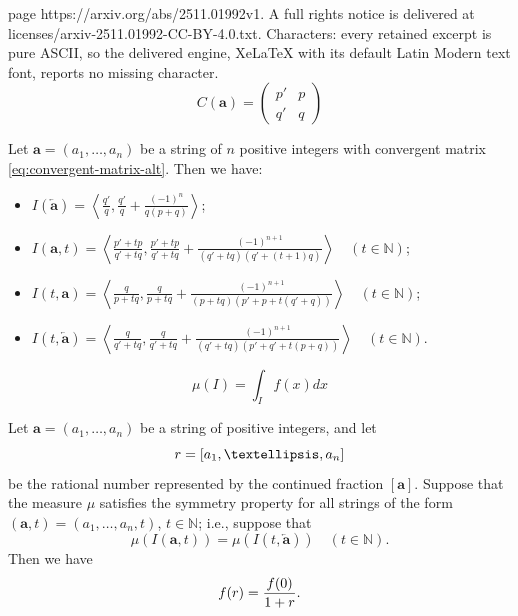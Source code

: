 \documentclass[10pt,a4paper]{amsart}
\newcommand{\Fundint}[1]{\left\langle #1\right\rangle}
\newcommand{\NN}{\mathbb{N}}
\newcommand{\bfar}{\overleftarrow{\bfa}}
\newcommand{\bfa}{\mathbf{a}}
\begin{document}
page https://arxiv.org/abs/2511.01992v1. A full rights notice is delivered at licenses/arxiv-2511.01992-CC-BY-4.0.txt. Characters: every retained excerpt is pure ASCII, so the delivered engine, XeLaTeX with its default Latin Modern text font, reports no missing character.
\begin{equation}
\label{eq:convergent-matrix-alt}
C(\bfa)=
\begin{pmatrix} p'&p\\q'&q \end{pmatrix}
\end{equation}

\begin{lemma}
\label{lem:fundamental-intervals1}
Let $\bfa=(a_1,\dots,a_n)$
be a string of $n$ positive integers with convergent matrix
\eqref{eq:convergent-matrix-alt}. Then we have:
\begin{itemize}
\item[(i)]
$\displaystyle I(\bfar)=
\Fundint{\frac{q'}{q},\frac{q'}{q}+\frac{(-1)^n}{q(p+q)}}$;

\item[(ii)]
$\displaystyle I(\bfa,t)=
\Fundint{\frac{p'+tp}{q'+tq},
\frac{p'+tp}{q'+tq}+\frac{(-1)^{n+1}}{(q'+tq)(q'+(t+1)q)}}
\quad(t\in\NN)$;

\item[(iii)]
$\displaystyle I(t,\bfa)=
\Fundint{\frac{q}{p+tq},\frac{q}{p+tq}+\frac{(-1)^{n+1}}{(p+tq)(p'+p +
t(q'+q))}} \quad(t\in\NN)$;

\item[(iv)]
$\displaystyle I(t,\bfar)=
\Fundint{\frac{q}{q'+tq},\frac{q}{q'+tq}+
\frac{(-1)^{n+1}}{(q'+tq)(p'+q'+t(p+q))}}
\quad(t\in\NN)$.

\end{itemize}

\end{lemma}

\begin{equation}
\label{eq:proof1.1-mu-def}
\mu(I)=\int_I f(x)dx
\end{equation}

\begin{lemma}
\label{lem:proof1.1-lemma1}
Let $\bfa=(a_1,\dots,a_n)$ be a string of positive integers,  and let
\begin{equation}
\notag
r=[a_1,\dots,a_n]
\end{equation}
be the rational number represented by the continued fraction $[\bfa]$.
Suppose that the measure
$\mu$ satisfies the symmetry property for all strings of the form
$(\bfa,t)=(a_1,\dots,a_n,t)$, $t\in\NN$; i.e., suppose that
\begin{equation}
\label{eq:proof1.1-symmetry1}
\mu(I(\bfa,t))=\mu(I(t,\bfar))\quad (t\in\NN).
\end{equation}
Then we have
\begin{equation}
\notag
f(r)=\frac{f(0)}{1+r}.
\end{equation}
\end{lemma}
\end{document}
